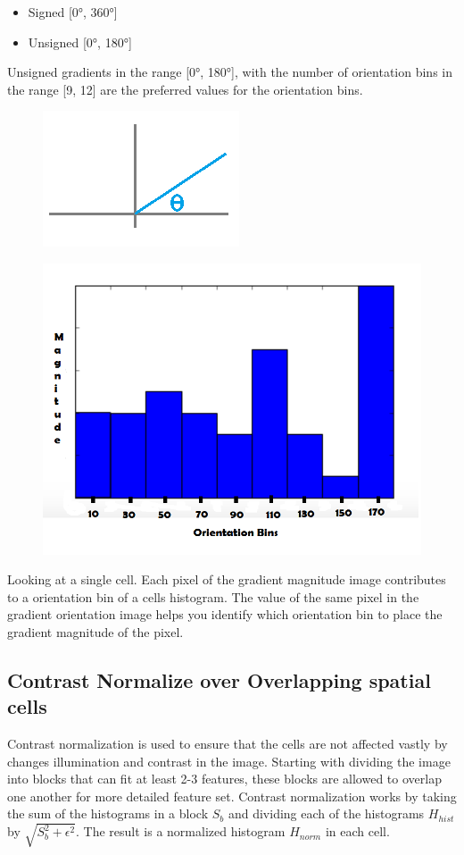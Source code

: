 \begin{itemize}
  \item Signed [0\si{\degree}, 360\si{\degree}] 
  \item Unsigned [0\si{\degree}, 180\si{\degree}] 
\end{itemize}
Unsigned gradients in the range [0\si{\degree}, 180\si{\degree}], with the number of orientation bins in the range [9, 12] are the preferred values for the orientation bins.
\begin{figure}[H]
\centering
\begin{minipage}{.5\textwidth}
  \centering
  \includegraphics[width=.5\linewidth]{theta}
  \label{fig:test1}
\end{minipage}%
\begin{minipage}{.5\textwidth}
  \centering
  \includegraphics[width=.5\linewidth]{hist}
  \label{fig:test2}
\end{minipage}
\end{figure}
Looking at a single cell. Each pixel of the gradient magnitude image contributes to a orientation bin of a cells histogram. The value of the same pixel in the gradient orientation image helps you identify which orientation bin to place the gradient magnitude of the pixel.

\subsection{Contrast Normalize over Overlapping spatial cells}
Contrast normalization is used to ensure that the cells are not affected vastly by changes illumination and contrast in the image. Starting with dividing the image into blocks that can fit at least 2-3 features, these blocks are allowed to overlap one another for more detailed feature set. Contrast normalization works by taking the sum of the histograms in a block $S_b$ and dividing each of the histograms $H_{hist}$ by $\sqrt{S_b ^2 + \epsilon ^2}$. The result is a normalized histogram $H_{norm}$ in each cell. 

